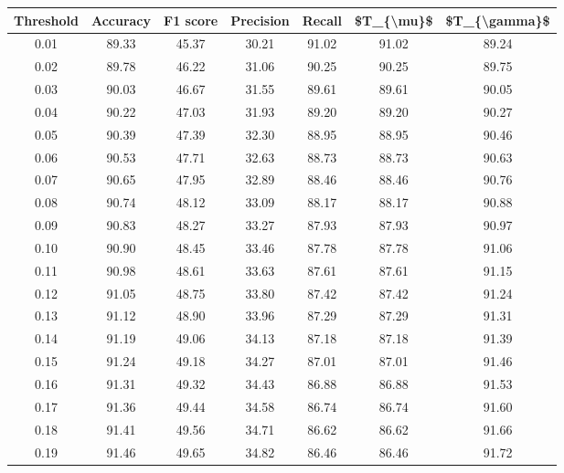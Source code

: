 \begin{tabular}{|c|c|c|c|c|c|c|}
\hline
 Threshold &  Accuracy &  F1 score &  Precision &  Recall &  \$T\_\{\textbackslash mu\}\$ &  \$T\_\{\textbackslash gamma\}\$ \\
\hline
      0.01 &     89.33 &     45.37 &      30.21 &   91.02 &      91.02 &         89.24 \\
      0.02 &     89.78 &     46.22 &      31.06 &   90.25 &      90.25 &         89.75 \\
      0.03 &     90.03 &     46.67 &      31.55 &   89.61 &      89.61 &         90.05 \\
      0.04 &     90.22 &     47.03 &      31.93 &   89.20 &      89.20 &         90.27 \\
      0.05 &     90.39 &     47.39 &      32.30 &   88.95 &      88.95 &         90.46 \\
      0.06 &     90.53 &     47.71 &      32.63 &   88.73 &      88.73 &         90.63 \\
      0.07 &     90.65 &     47.95 &      32.89 &   88.46 &      88.46 &         90.76 \\
      0.08 &     90.74 &     48.12 &      33.09 &   88.17 &      88.17 &         90.88 \\
      0.09 &     90.83 &     48.27 &      33.27 &   87.93 &      87.93 &         90.97 \\
      0.10 &     90.90 &     48.45 &      33.46 &   87.78 &      87.78 &         91.06 \\
      0.11 &     90.98 &     48.61 &      33.63 &   87.61 &      87.61 &         91.15 \\
      0.12 &     91.05 &     48.75 &      33.80 &   87.42 &      87.42 &         91.24 \\
      0.13 &     91.12 &     48.90 &      33.96 &   87.29 &      87.29 &         91.31 \\
      0.14 &     91.19 &     49.06 &      34.13 &   87.18 &      87.18 &         91.39 \\
      0.15 &     91.24 &     49.18 &      34.27 &   87.01 &      87.01 &         91.46 \\
      0.16 &     91.31 &     49.32 &      34.43 &   86.88 &      86.88 &         91.53 \\
      0.17 &     91.36 &     49.44 &      34.58 &   86.74 &      86.74 &         91.60 \\
      0.18 &     91.41 &     49.56 &      34.71 &   86.62 &      86.62 &         91.66 \\
      0.19 &     91.46 &     49.65 &      34.82 &   86.46 &      86.46 &         91.72 \\

\end{tabular}
